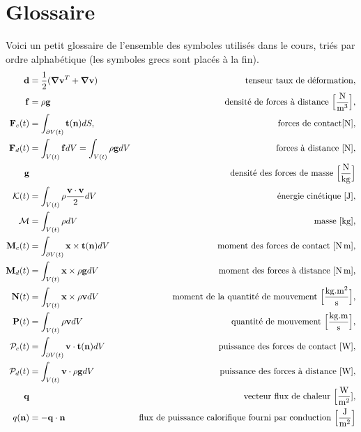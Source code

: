 \chapter{Glossaire}
  Voici un petit glossaire de l'ensemble des symboles utilisés dans le cours, triés par ordre alphabétique (les symboles grecs sont placés à la fin).
  \begingroup
  \allowdisplaybreaks
  \begin{align*}
    \vb{d} &= \frac{1}{2}(\grad\vb{v}^T + \grad\vb{v}) & \textrm{tenseur taux de déformation},\\
    \vb{f} &= \rho \vb{g} & \textrm{densité de forces à distance } \Big[\si{\frac{N}{m^3}}\Big], \\
    \mathcal{\vb{F}}_c (t) &= \int_{\partial V(t)} \vb{t}(\vb{n}) dS, & \textrm{forces de contact} [\si{N}],\\
    \mathcal{\vb{F}}_d (t) &= \int_{V(t)} \vb{f} dV = \int_{V(t)} \rho \vb{g} dV & \textrm{forces à distance } [\si{N}],\\
    \vb{g} & & \textrm {densité des forces de masse } \Big[\si{\frac{N}{kg}}\Big]\\
    \mathcal{K}(t) &= \int_{V(t)} \rho \frac{\vb{v}\cdot\vb{v}}{2} dV & \textrm{énergie cinétique } [\si{J}],\\
    \mathcal{M} & = \int_{V(t)} \rho dV  & \textrm{masse [\si{kg}],}\\
    \mathcal{\vb{M}}_c (t) &= \int_{\partial V(t)} \vb{x} \times \vb{t}(\vb{n}) dV & \textrm{moment des forces de contact } [\si{N.m}],\\
    \mathcal{\vb{M}}_d (t) &= \int_{V(t)} \vb{x} \times \rho \vb{g} dV & \textrm{moment des forces à distance } [\si{N.m}],\\
    \mathcal{\vb{N}}(t) &= \int_{V(t)} \vb{x} \times \rho \vb{v} dV & \textrm{moment de la quantité de mouvement } \Big[\si{\frac{kg.m^2}{s}}\Big],\\
    \mathcal{\vb{P}}(t) &= \int_{V(t)} \rho \vb{v} dV & \textrm{quantité de mouvement } \Big[\si{\frac{kg.m}{s}}\Big],\\
    \mathcal{P}_c(t) &= \int_{\partial V(t)} \vb{v} \cdot \vb{t}(\vb{n}) dV & \textrm{puissance des forces de contact } [\si{W}], \\
    \mathcal{P}_d(t) &= \int_{V(t)} \vb{v} \cdot \rho \vb{g} dV & \textrm{puissance des forces à distance } [\si{W}], \\
    \vb{q} & & \textrm{vecteur flux de chaleur } \Big[\si{\frac{W}{m^2}}], \\
    q(\vb{n}) &= - \vb{q} \cdot \vb{n} & \textrm{flux de puissance calorifique fourni par conduction } \Big[\si{\frac{J}{m^2}}\Big]\\

\end{align*}

